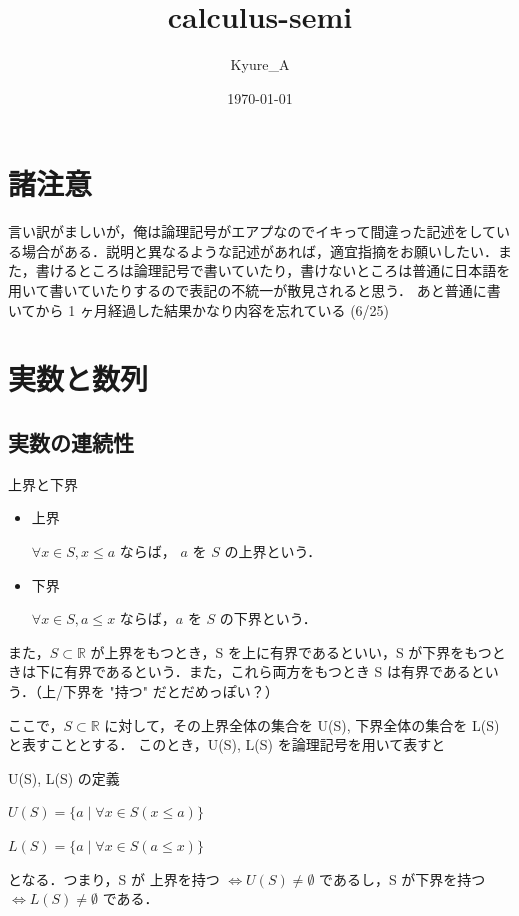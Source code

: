 \documentclass[a4paper]{ltjsarticle}
\title{calculus-semi}
\author{Kyure\_A}
\date{\today}
\begin{document}
 
 \maketitle

 \section*{諸注意}
 言い訳がましいが，俺は論理記号がエアプなのでイキって間違った記述をしている場合がある．説明と異なるような記述があれば，適宜指摘をお願いしたい．また，書けるところは論理記号で書いていたり，書けないところは普通に日本語を用いて書いていたりするので表記の不統一が散見されると思う．
 あと普通に書いてから 1 ヶ月経過した結果かなり内容を忘れている (6/25)

 \tableofcontents
 \clearpage

 \section{実数と数列}

  \subsection{実数の連続性}

  \begin{tcb}{上界と下界}{}
   \begin{itemize}
    \item 上界 

	  $\forall x \in S, x \leq a$ ならば， $a$ を $S$ の上界という．

    \item 下界 

	  $\forall x \in S, a \leq x$ ならば，$a$ を $S$ の下界という．

   \end{itemize}
  \end{tcb}
  
  また，$S \subset \mathbb{R}$ が上界をもつとき，S を上に有界であるといい，S が下界をもつときは下に有界であるという．また，これら両方をもつとき S は有界であるという．（上/下界を "持つ" だとだめっぽい？）

  ここで，$S \subset \mathbb{R}$ に対して，その上界全体の集合を U(S), 下界全体の集合を L(S) と表すこととする．
  このとき，U(S), L(S) を論理記号を用いて表すと
  \begin{tcb}{U(S), L(S) の定義}{}
   \centerline
   {$
   U(S) = \{a \mid \forall x \in S (x \leq a)\}
   $}
   \centerline
   {$
   L(S) = \{a \mid \forall x \in S (a \leq x)\}
   $}
  \end{tcb}
  となる．つまり，S が 上界を持つ $\Leftrightarrow U(S) \neq \emptyset$  であるし，S が下界を持つ $\Leftrightarrow L(S) \neq \emptyset$ である．
  
\end{document}
